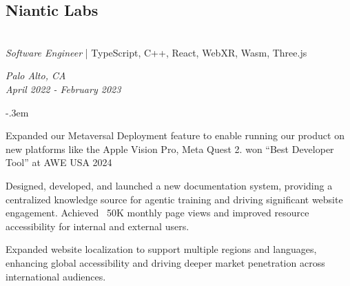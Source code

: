 \documentclass{article}
\let\olditemize=\itemize \let\endolditemize=\enditemize
\renewenvironment{itemize}{\olditemize[topsep=0em] \itemsep-.3em}{\endolditemize}
\newenvironment{twocolentry}[2][]{
    \def\secondColumn{#2}
    \raggedright
    \setcolumnwidth{\fill, 6cm}
    \begin{paracol}{2}
}{
    \switchcolumn \raggedleft \secondColumn
    \end{paracol}
} %
\begin{document}
\begin{twocolentry}{
  \textit{Palo Alto, CA} \\
  \textit{April 2022 - February 2023}
}
\subsection{Niantic Labs}\hfill\\
\textit{Software Engineer} | TypeScript, C++, React, WebXR, Wasm, Three.js
\end{twocolentry}
\begin{itemize}
  \item Expanded our Metaversal Deployment feature to enable running our product on new platforms
  like the Apple Vision Pro, Meta Quest 2. won “Best Developer Tool” at AWE USA 2024
  \item Designed, developed, and launched a new documentation system, providing a centralized
  knowledge source for agentic training and driving significant website engagement. Achieved ~50K
  monthly page views and improved resource accessibility for internal and external users.
  \item Expanded website localization to support multiple regions and languages, enhancing global
  accessibility and driving deeper market penetration across international audiences.
\end{itemize}
\end{document}

